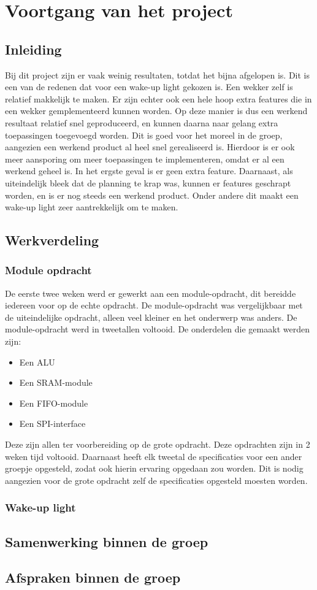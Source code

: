 \chapter{Voortgang van het project}

\section{Inleiding}
Bij dit project zijn er vaak weinig resultaten, totdat het bijna afgelopen is. 
Dit is een van de redenen dat voor een wake-up light gekozen is.
Een wekker zelf is relatief makkelijk te maken. 
Er zijn echter ook een hele hoop extra features die in een wekker gemplementeerd kunnen worden. 
Op deze manier is dus een werkend resultaat relatief snel geproduceerd, en kunnen daarna naar gelang extra toepassingen toegevoegd worden. 
Dit is goed voor het moreel in de groep, aangezien een werkend product al heel snel gerealiseerd is.
Hierdoor is er ook meer aansporing om meer toepassingen te implementeren, omdat er al een werkend geheel is. 
In het ergste geval is er geen extra feature.
Daarnaast, als uiteindelijk bleek dat de planning te krap was, kunnen er features geschrapt worden, en is er nog steeds een werkend product. 
Onder andere dit maakt een wake-up light zeer aantrekkelijk om te maken.

\section{Werkverdeling}
\subsection{Module opdracht}
De eerste twee weken werd er gewerkt aan een module-opdracht, dit bereidde iedereen voor op de echte opdracht. 
De module-opdracht was vergelijkbaar met de uiteindelijke opdracht, alleen veel kleiner en het onderwerp was anders.
De module-opdracht werd in tweetallen voltooid. De onderdelen die gemaakt werden zijn:
\begin{itemize}[nolistsep]
	\item Een ALU
	\item Een SRAM-module
	\item Een FIFO-module
	\item Een SPI-interface
\end{itemize}
Deze zijn allen ter voorbereiding op de grote opdracht. Deze opdrachten zijn in 2 weken tijd voltooid. 
Daarnaast heeft elk tweetal de specificaties voor een ander groepje opgesteld, zodat ook hierin ervaring opgedaan zou worden.
Dit is nodig aangezien voor de grote opdracht zelf de specificaties opgesteld moesten worden. 

\subsection{Wake-up light}


\section{Samenwerking binnen de groep}

\section{Afspraken binnen de groep}
